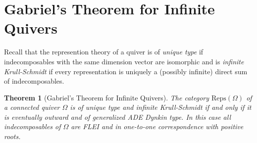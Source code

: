 \documentclass{article}
\newtheorem{theorem}{Theorem}
\newtheorem{example}{Example}[section]
\begin{document}

\section{Gabriel's Theorem for Infinite Quivers} \label{sec: infininte gabs theorem}


Recall that the represention theory of a quiver is of \emph{unique type} if indecomposables with the same dimension vector are isomorphic and  is \emph{infinite Krull-Schmidt} if every representation is uniquely a (possibly infinite) direct sum of indecomposables. 







\begin{theorem}[Gabriel's Theorem for Infinite Quivers]\label{thm: infinite dimensional infinite gabriel's theorem }
    The category $\text{Reps}(\Omega)$ of a connected quiver $\Omega$ is of unique type and infinite Krull-Schmidt if and only if it is eventually outward and of generalized ADE Dynkin type. In this case all indecomposables of $\Omega$ are FLEI and in one-to-one correspondence with positive roots.  
\end{theorem}
\end{document}
